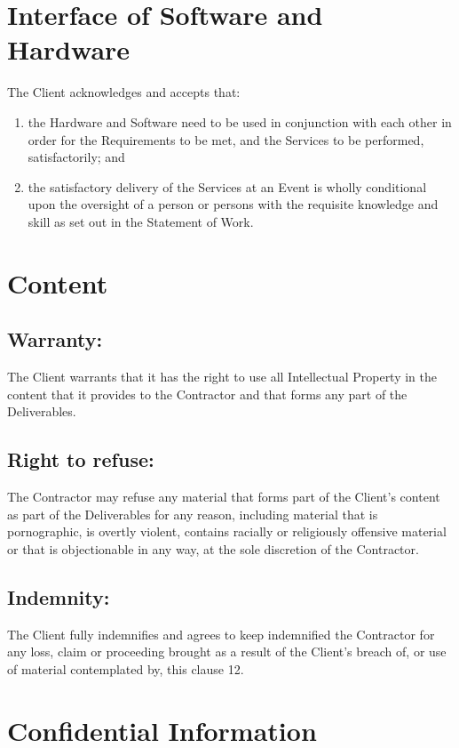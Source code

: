 \documentclass[a4paper,12pt]{article}
\begin{document}
\section{Interface of Software and Hardware}
The Client acknowledges and accepts that:
\begin{enumerate}
\item the Hardware and Software need to be used in conjunction with each other in order for the Requirements to be met, and the Services to be performed, satisfactorily; and
\item the satisfactory delivery of the Services at an Event is wholly conditional upon the oversight of a person or persons with the requisite knowledge and skill as set out in the Statement of Work.  
\end{enumerate}
\section{Content}
\subsection{Warranty:}  The Client warrants that it has the right to use all Intellectual Property in the content that it provides to the Contractor and that forms any part of the Deliverables.
\subsection{Right to refuse:}  The Contractor may refuse any material that forms part of the Client’s content as part of the Deliverables for any reason, including material that is pornographic, is overtly violent, contains racially or religiously offensive material or that is objectionable in any way, at the sole discretion of the Contractor.
\subsection{Indemnity:}  The Client fully indemnifies and agrees to keep indemnified the Contractor for any loss, claim or proceeding brought as a result of the Client’s breach of, or use of material contemplated by, this clause 12.
\section{Confidential Information}
\end{document}
